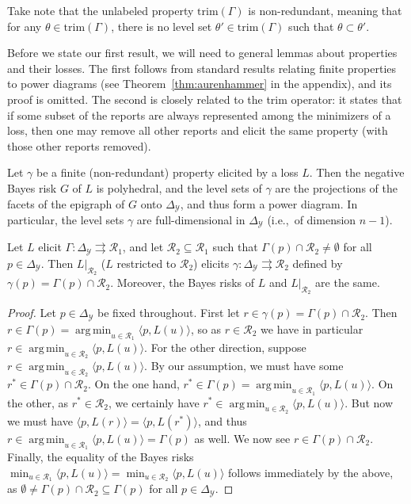 \documentclass[anon,12pt]{colt2019}
\newcommand{\simplex}{\Delta_\Y}
\newcommand{\R}{\mathcal{R}}
\newcommand{\Y}{\mathcal{Y}}
\newcommand{\inprod}[2]{\langle #1, #2 \rangle}%
\newcommand{\toto}{\rightrightarrows}
\newcommand{\trim}{\mathrm{trim}}
\DeclareMathOperator*{\argmin}{arg\,min}
\begin{document}
Take note that the unlabeled property $\trim(\Gamma)$ is non-redundant, meaning that for any $\theta \in \trim(\Gamma)$, there is no level set $\theta' \in \trim(\Gamma)$ such that $\theta \subset \theta'$.

Before we state our first result, we will need to general lemmas about properties and their losses.
The first follows from standard results relating finite properties to power diagrams (see Theorem~\ref{thm:aurenhammer} in the appendix), and its proof is omitted.
The second is closely related to the trim operator: it states that if some subset of the reports are always represented among the minimizers of a loss, then one may remove all other reports and elicit the same property (with those other reports removed).

\begin{lemma}\label{lem:finite-full-dim}
  Let $\gamma$ be a finite (non-redundant) property elicited by a loss $L$.
  Then the negative Bayes risk $G$ of $L$ is polyhedral, and the level sets of $\gamma$ are the projections of the facets of the epigraph of $G$ onto $\simplex$, and thus form a power diagram.
  In particular, the level sets $\gamma$ are full-dimensional in $\simplex$ (i.e.,\ of dimension $n-1$).
\end{lemma}

\begin{lemma}\label{lem:loss-restrict}
  Let $L$ elicit $\Gamma:\simplex\toto\R_1$, and let $\R_2\subseteq\R_1$ such that $\Gamma(p) \cap \R_2 \neq \emptyset$ for all $p\in\simplex$.
  Then $L|_{\R_2}$ ($L$ restricted to $\R_2$) elicits $\gamma:\simplex\toto\R_2$ defined by $\gamma(p) = \Gamma(p)\cap \R_2$.
  Moreover, the Bayes risks of $L$ and $L|_{\R_2}$ are the same.
\end{lemma}
\begin{proof}
  Let $p\in\simplex$ be fixed throughout.
  First let $r \in \gamma(p) = \Gamma(p) \cap \R_2$.
  Then $r \in \Gamma(p) = \argmin_{u\in\R_1} \inprod{p}{L(u)}$, so as $r\in\R_2$ we have in particular $r \in \argmin_{u\in\R_2} \inprod{p}{L(u)}$.
  For the other direction, suppose $r \in \argmin_{u\in\R_2} \inprod{p}{L(u)}$.
  By our assumption, we must have some $r^* \in \Gamma(p) \cap \R_2$.
  On the one hand, $r^*\in\Gamma(p) = \argmin_{u\in\R_1} \inprod{p}{L(u)}$.
  On the other, as $r^* \in \R_2$, we certainly have $r^* \in \argmin_{u\in\R_2} \inprod{p}{L(u)}$.
  But now we must have $\inprod{p}{L(r)} = \inprod{p}{L(r^*)}$, and thus $r \in \argmin_{u\in\R_1} \inprod{p}{L(u)} = \Gamma(p)$ as well.
  We now see $r \in \Gamma(p) \cap \R_2$.
  Finally, the equality of the Bayes risks $\min_{u\in\R_1} \inprod{p}{L(u)} = \min_{u\in\R_2} \inprod{p}{L(u)}$ follows immediately by the above, as $\emptyset \neq \Gamma(p)\cap\R_2 \subseteq \Gamma(p)$ for all $p\in\simplex$.
\end{proof}
\end{document}
